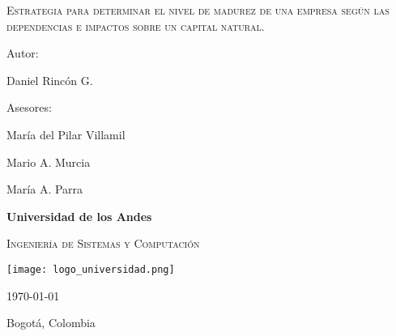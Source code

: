 \begin{titlepage}
    \centering
    {\scshape\Huge Estrategia para determinar el nivel de madurez de una empresa según las dependencias e impactos sobre un capital natural. \par}
    \vfill
    {\Large Autor: \par}
    {\Large Daniel Rincón G. \par}
    \vfill
     {\Large Asesores: \par}
    {\large María del Pilar Villamil \par}
    {\large Mario A. Murcia \par}
    {\large María A. Parra \par}
    \vfill
    {\bfseries\LARGE Universidad de los Andes \par}
    \vspace{1cm}
    {\scshape\Large Ingeniería de Sistemas y Computación \par}
    \vspace{3cm}
    \texttt{[image: logo\_universidad.png]}
    \vfill
    {\Large \today \par}
    \vfill
    {\Large Bogotá, Colombia \par}
\end{titlepage}